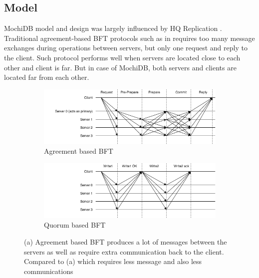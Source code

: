 \documentclass[letterpaper,twocolumn,10pt]{article}
\begin{document}
\subsection{Model}

MochiDB model and design was largely influenced by HQ Replication \cite{HQ_replication}. Traditional agreement-based BFT protocols such as in \cite{Practical_BFT} requires too many message exchanges during operations between servers, but only one request and reply to the client. Such protocol performs well when servers are located close to each other and client is far. But in case of MochiDB, both servers and clients are located far from each other.

\begin{figure}
\centering
\begin{subfigure}[b]{0.45\textwidth}
   \includegraphics[width=1\linewidth]{Communication_agreement.png}
   \caption{Agreement based BFT}
   \label{fig:Ng1} 
\end{subfigure}

\begin{subfigure}[b]{0.45\textwidth}
   \includegraphics[width=1\linewidth]{Communication_quorum.png}
   \caption{Quorum based BFT}
   \label{fig:Ng2}
\end{subfigure}

\caption[Two numerical solutions]{(a) Agreement based BFT produces a lot of messages between the servers as well as require extra communication back to the client. Compared to (a) which requires less message and also less communications}
\end{figure}
\end{document}
